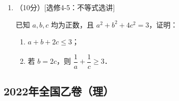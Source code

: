 \begin{description}
\begin{enumerate}[leftmargin=5pt]
        \item （10分）[选修4-5：不等式选讲]

        已知 $a,b,c$ 均为正数，且 $a^2+b^2+4c^2=3$，证明：

        \begin{enumerate}[label=(\arabic*)]
            \item $a+b+2c\leqslant3$；
            \item 若 $b=2c$，则 $\dfrac{1}{a}+\dfrac{1}{c}\geqslant3$．
        \end{enumerate}
    \end{enumerate}
\end{description}
\clearpage


\subsection{2022年全国乙卷（理）}\label{gk:2022年全国乙卷（理）}

